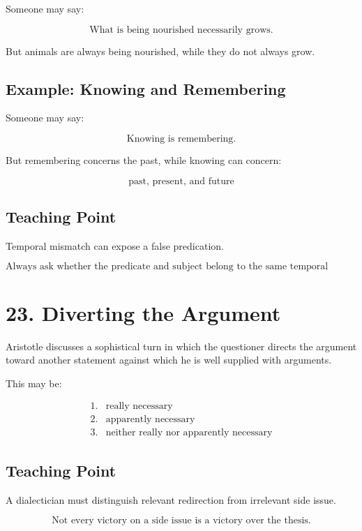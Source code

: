 \documentclass[12pt]{article}
\begin{document}
Someone may say:

\[
\text{What is being nourished necessarily grows.}
\]

But animals are always being nourished, while they do not always grow.

\subsection*{Example: Knowing and Remembering}

Someone may say:

\[
\text{Knowing is remembering.}
\]

But remembering concerns the past, while knowing can concern:

\[
\text{past, present, and future}
\]

\subsection*{Teaching Point}

Temporal mismatch can expose a false predication.

\[
\boxed{
\text{Always ask whether the predicate and subject belong to the same temporal range.}
}
\]

\section*{23. Diverting the Argument}

Aristotle discusses a sophistical turn in which the questioner directs the
argument toward another statement against which he is well supplied with
arguments.

This may be:

\[
\begin{array}{ll}
1. & \text{really necessary} \\
2. & \text{apparently necessary} \\
3. & \text{neither really nor apparently necessary}
\end{array}
\]

\subsection*{Teaching Point}

A dialectician must distinguish relevant redirection from irrelevant side issue.

\[
\boxed{
\text{Not every victory on a side issue is a victory over the thesis.}
}
\]
\end{document}
